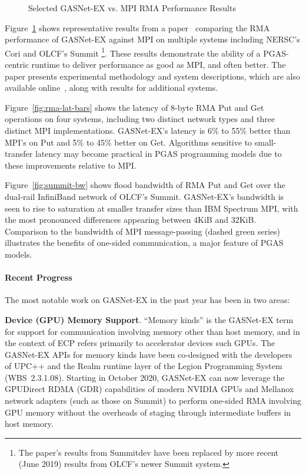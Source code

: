 \begin{figure}[htb]
  \centering
  \caption{\label{fig:gasnet-ex-rma} Selected GASNet-EX vs. MPI RMA Performance Results}
\end{figure}

Figure~\ref{fig:gasnet-ex-rma} shows representative results from a
paper~\cite{gasnet-lcpc18} comparing
the RMA performance of GASNet-EX against MPI on multiple systems including
NERSC's Cori and OLCF's Summit%
\footnote{The paper's results from Summitdev
have been replaced by more recent (June 2019) results from OLCF's newer Summit system.}.
These results demonstrate the ability of a PGAS-centric runtime to
deliver performance as good as MPI, and often better.
%
The paper presents experimental methodology and system descriptions, which are
also available online~\cite{gasnet-site}, along with results for additional
systems.

Figure~\ref{fig:rma-lat-bars} shows the latency of 8-byte RMA Put and Get operations on
four systems, including two distinct network types and three distinct MPI
implementations.
%
GASNet-EX's latency is 6\% to 55\% better than MPI's on Put and 5\% to 45\%
better on Get.
%
Algorithms sensitive to small-transfer latency may become practical in PGAS
programming models due to these improvements relative to MPI.

Figure~\ref{fig:summit-bw} shows flood bandwidth of RMA Put and Get over the
dual-rail InfiniBand network of OLCF's Summit.
GASNet-EX's bandwidth is seen to rise to saturation at smaller
transfer sizes than IBM Spectrum MPI, with the most pronounced differences
appearing between 4KiB and 32KiB.
%
Comparison to the bandwidth of MPI message-passing (dashed green series) illustrates the
benefits of one-sided communication, a major feature of PGAS models.


\paragraph{Recent Progress}

The most notable work on GASNet-EX in the past year has been in two areas:

\textbf{Device (GPU) Memory Support}.
``Memory kinds'' is the GASNet-EX term for support for communication involving
memory other than host memory, and in the context of ECP refers primarily to
accelerator devices such GPUs.
The GASNet-EX APIs for memory kinds have been co-designed with the developers
of UPC++ and the Realm runtime layer of the Legion Programming System
(WBS~2.3.1.08).  
Starting in October 2020, GASNet-EX can now leverage the GPUDirect RDMA (GDR)
capabilities of modern NVIDIA GPUs and Mellanox network adapters (such as those
on Summit) to perform one-sided RMA involving GPU memory without
the overheads of staging through intermediate buffers in host memory.

